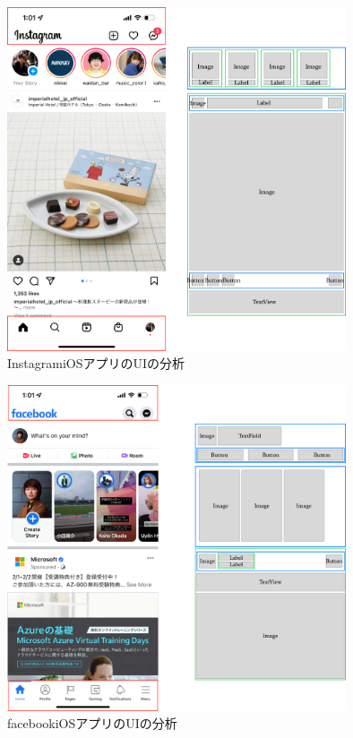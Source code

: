 \begin{figure}[htbp]
  \begin{minipage}{\hsize}
    \begin{center}
       \includegraphics[width=100mm]{img/instagram_analyze.png}
    \end{center}
    \caption{InstagramiOSアプリのUIの分析}
    \label{fig:instagram_analyze}
  \end{minipage}
\end{figure}

\begin{figure}[htbp]
  \begin{minipage}{\hsize}
    \begin{center}
       \includegraphics[width=100mm]{img/facebook_analyze.png}
    \end{center}
    \caption{facebookiOSアプリのUIの分析}
    \label{fig:facebook_analyze}
  \end{minipage}
\end{figure}


